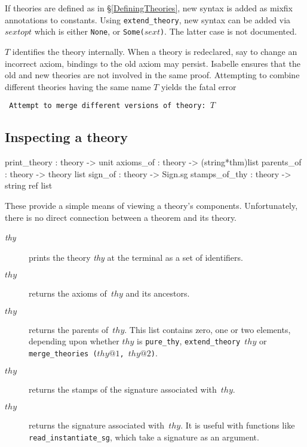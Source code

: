 \begin{description}
If theories are defined as in \S\ref{DefiningTheories}, new syntax is added
as mixfix annotations to constants.  Using {\tt extend_theory}, new syntax can
be added via $sextopt$ which is either {\tt None}, or {\tt Some($sext$)}.  The
latter case is not documented.

$T$ identifies the theory internally.  When a theory is redeclared, say to
change an incorrect axiom, bindings to the old axiom may persist.  Isabelle
ensures that the old and new theories are not involved in the same proof.
Attempting to combine different theories having the same name $T$ yields the
fatal error
\begin{center} \tt
Attempt to merge different versions of theory: $T$
\end{center}
\end{description}


\subsection{Inspecting a theory}
\begin{ttbox} 
print_theory  : theory -> unit
axioms_of     : theory -> (string*thm)list
parents_of    : theory -> theory list
sign_of       : theory -> Sign.sg
stamps_of_thy : theory -> string ref list
\end{ttbox}
These provide a simple means of viewing a theory's components.
Unfortunately, there is no direct connection between a theorem and its
theory.
\begin{description}
\item[ {\it thy}]  
prints the theory {\it thy\/} at the terminal as a set of identifiers.

\item[ $thy$] 
returns the axioms of~$thy$ and its ancestors.

\item[ $thy$] 
returns the parents of~$thy$.  This list contains zero, one or two
elements, depending upon whether $thy$ is {\tt pure_thy}, 
\hbox{\tt extend_theory $thy$} or \hbox{\tt merge_theories ($thy@1$, $thy@2$)}.

\item[ $thy$]
returns the stamps of the signature associated with~$thy$.

\item[ $thy$] 
returns the signature associated with~$thy$.  It is useful with functions
like {\tt read_instantiate_sg}, which take a signature as an argument.
\end{description}


